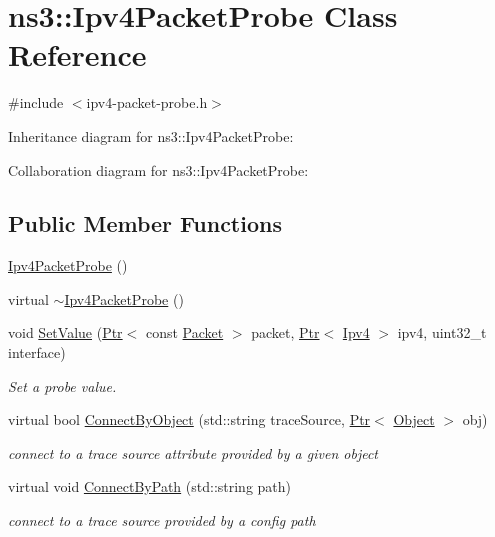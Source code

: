 \hypertarget{classns3_1_1Ipv4PacketProbe}{}\section{ns3\+:\+:Ipv4\+Packet\+Probe Class Reference}
\label{classns3_1_1Ipv4PacketProbe}


{\ttfamily \#include $<$ipv4-\/packet-\/probe.\+h$>$}



Inheritance diagram for ns3\+:\+:Ipv4\+Packet\+Probe\+:


Collaboration diagram for ns3\+:\+:Ipv4\+Packet\+Probe\+:
\subsection*{Public Member Functions}
\begin{DoxyCompactItemize}
\item 
\hyperlink{classns3_1_1Ipv4PacketProbe_a61a1a83baaef630945fdd1a6dd88a340}{Ipv4\+Packet\+Probe} ()
\item 
virtual \hyperlink{classns3_1_1Ipv4PacketProbe_a2323b6dfe1b59a8381e11c5237510d97}{$\sim$\+Ipv4\+Packet\+Probe} ()
\item 
void \hyperlink{classns3_1_1Ipv4PacketProbe_ae55bd952379cf21591e2539f58890a37}{Set\+Value} (\hyperlink{classns3_1_1Ptr}{Ptr}$<$ const \hyperlink{classns3_1_1Packet}{Packet} $>$ packet, \hyperlink{classns3_1_1Ptr}{Ptr}$<$ \hyperlink{classns3_1_1Ipv4}{Ipv4} $>$ ipv4, uint32\+\_\+t interface)
\begin{DoxyCompactList}\small\item\em Set a probe value. \end{DoxyCompactList}\item 
virtual bool \hyperlink{classns3_1_1Ipv4PacketProbe_aa143604f9e79ffa3aca634a05456f90d}{Connect\+By\+Object} (std\+::string trace\+Source, \hyperlink{classns3_1_1Ptr}{Ptr}$<$ \hyperlink{classns3_1_1Object}{Object} $>$ obj)
\begin{DoxyCompactList}\small\item\em connect to a trace source attribute provided by a given object \end{DoxyCompactList}\item 
virtual void \hyperlink{classns3_1_1Ipv4PacketProbe_a9369efa232346b76cdd3e8c51b3e8e9b}{Connect\+By\+Path} (std\+::string path)
\begin{DoxyCompactList}\small\item\em connect to a trace source provided by a config path \end{DoxyCompactList}\end{DoxyCompactItemize}
